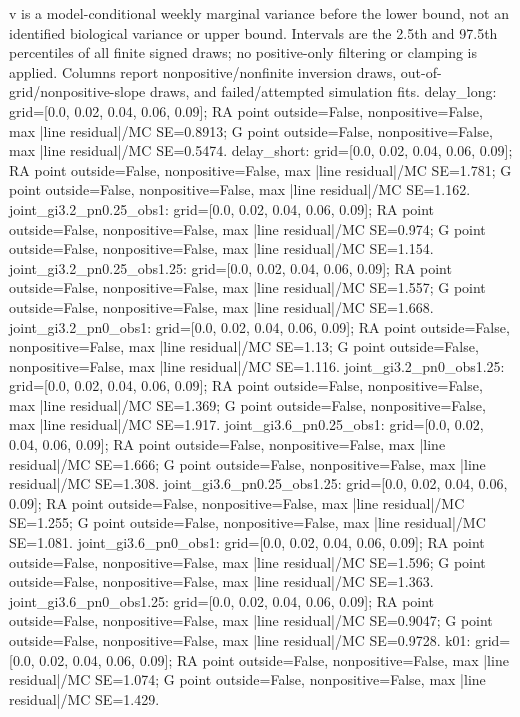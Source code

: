 \begin{table}[htbp]
\begin{tabularx}{\linewidth}
\bottomrule
\end{tabularx}
\par\smallskip
\begin{minipage}{\linewidth}\footnotesize\raggedright
v is a model-conditional weekly marginal variance before the lower bound, not an identified biological variance or upper bound. Intervals are the 2.5th and 97.5th percentiles of all finite signed draws; no positive-only filtering or clamping is applied. Columns report nonpositive/nonfinite inversion draws, out-of-grid/nonpositive-slope draws, and failed/attempted simulation fits. delay\_\allowbreak{}long: grid=[0.0, 0.02, 0.04, 0.06, 0.09]; RA point outside=False, nonpositive=False, max |line residual|/MC SE=0.8913; G point outside=False, nonpositive=False, max |line residual|/MC SE=0.5474. delay\_\allowbreak{}short: grid=[0.0, 0.02, 0.04, 0.06, 0.09]; RA point outside=False, nonpositive=False, max |line residual|/MC SE=1.781; G point outside=False, nonpositive=False, max |line residual|/MC SE=1.162. joint\_\allowbreak{}gi3.2\_\allowbreak{}pn0.25\_\allowbreak{}obs1: grid=[0.0, 0.02, 0.04, 0.06, 0.09]; RA point outside=False, nonpositive=False, max |line residual|/MC SE=0.974; G point outside=False, nonpositive=False, max |line residual|/MC SE=1.154. joint\_\allowbreak{}gi3.2\_\allowbreak{}pn0.25\_\allowbreak{}obs1.25: grid=[0.0, 0.02, 0.04, 0.06, 0.09]; RA point outside=False, nonpositive=False, max |line residual|/MC SE=1.557; G point outside=False, nonpositive=False, max |line residual|/MC SE=1.668. joint\_\allowbreak{}gi3.2\_\allowbreak{}pn0\_\allowbreak{}obs1: grid=[0.0, 0.02, 0.04, 0.06, 0.09]; RA point outside=False, nonpositive=False, max |line residual|/MC SE=1.13; G point outside=False, nonpositive=False, max |line residual|/MC SE=1.116. joint\_\allowbreak{}gi3.2\_\allowbreak{}pn0\_\allowbreak{}obs1.25: grid=[0.0, 0.02, 0.04, 0.06, 0.09]; RA point outside=False, nonpositive=False, max |line residual|/MC SE=1.369; G point outside=False, nonpositive=False, max |line residual|/MC SE=1.917. joint\_\allowbreak{}gi3.6\_\allowbreak{}pn0.25\_\allowbreak{}obs1: grid=[0.0, 0.02, 0.04, 0.06, 0.09]; RA point outside=False, nonpositive=False, max |line residual|/MC SE=1.666; G point outside=False, nonpositive=False, max |line residual|/MC SE=1.308. joint\_\allowbreak{}gi3.6\_\allowbreak{}pn0.25\_\allowbreak{}obs1.25: grid=[0.0, 0.02, 0.04, 0.06, 0.09]; RA point outside=False, nonpositive=False, max |line residual|/MC SE=1.255; G point outside=False, nonpositive=False, max |line residual|/MC SE=1.081. joint\_\allowbreak{}gi3.6\_\allowbreak{}pn0\_\allowbreak{}obs1: grid=[0.0, 0.02, 0.04, 0.06, 0.09]; RA point outside=False, nonpositive=False, max |line residual|/MC SE=1.596; G point outside=False, nonpositive=False, max |line residual|/MC SE=1.363. joint\_\allowbreak{}gi3.6\_\allowbreak{}pn0\_\allowbreak{}obs1.25: grid=[0.0, 0.02, 0.04, 0.06, 0.09]; RA point outside=False, nonpositive=False, max |line residual|/MC SE=0.9047; G point outside=False, nonpositive=False, max |line residual|/MC SE=0.9728. k01: grid=[0.0, 0.02, 0.04, 0.06, 0.09]; RA point outside=False, nonpositive=False, max |line residual|/MC SE=1.074; G point outside=False, nonpositive=False, max |line residual|/MC SE=1.429. 
\end{minipage}
\end{table}
